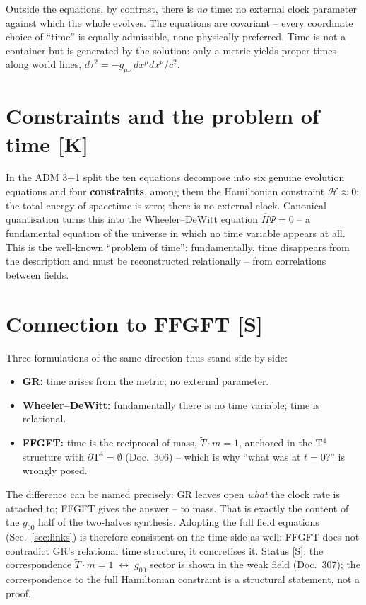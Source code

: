 Outside the equations, by contrast, there is \emph{no} time: no
external clock parameter against which the whole evolves. The
equations are covariant -- every coordinate choice of
\enquote{time} is equally admissible, none physically preferred.
Time is not a container but is generated by the solution: only a
metric yields proper times along world lines,
$d\tau^2 = -g_{\mu\nu}\,dx^\mu dx^\nu/c^2$.

\section{Constraints and the problem of time [K]}

In the ADM 3+1 split the ten equations decompose into six genuine
evolution equations and four \textbf{constraints}, among them the
Hamiltonian constraint $\mathcal{H} \approx 0$: the total energy of
spacetime is zero; there is no external clock. Canonical
quantisation turns this into the Wheeler--DeWitt equation
$\hat{H}\Psi = 0$ -- a fundamental equation of the universe in
which no time variable appears at all. This is the well-known
\enquote{problem of time}: fundamentally, time disappears from the
description and must be reconstructed relationally -- from
correlations between fields.

\section{Connection to FFGFT [S]}

Three formulations of the same direction thus stand side by side:

\begin{itemize}
  \item \textbf{GR:} time arises from the metric; no external
        parameter.
  \item \textbf{Wheeler--DeWitt:} fundamentally there is no time
        variable; time is relational.
  \item \textbf{FFGFT:} time is the reciprocal of mass,
        $\tilde T \cdot m = 1$, anchored in the T$^4$ structure with
        $\partial\text{T}^4 = \emptyset$ (Doc.~306) -- which is why
        \enquote{what was at $t=0$?} is wrongly posed.
\end{itemize}

The difference can be named precisely: GR leaves open \emph{what}
the clock rate is attached to; FFGFT gives the answer -- to mass.
That is exactly the content of the $g_{00}$ half of the two-halves
synthesis. Adopting the full field equations (Sec.~\ref{sec:links}) is therefore
consistent on the time side as well: FFGFT does not contradict GR's
relational time structure, it concretises it. Status [S]: the
correspondence $\tilde T \cdot m = 1 \;\leftrightarrow\; g_{00}$
sector is shown in the weak field (Doc.~307); the correspondence to
the full Hamiltonian constraint is a structural statement, not a
proof.

